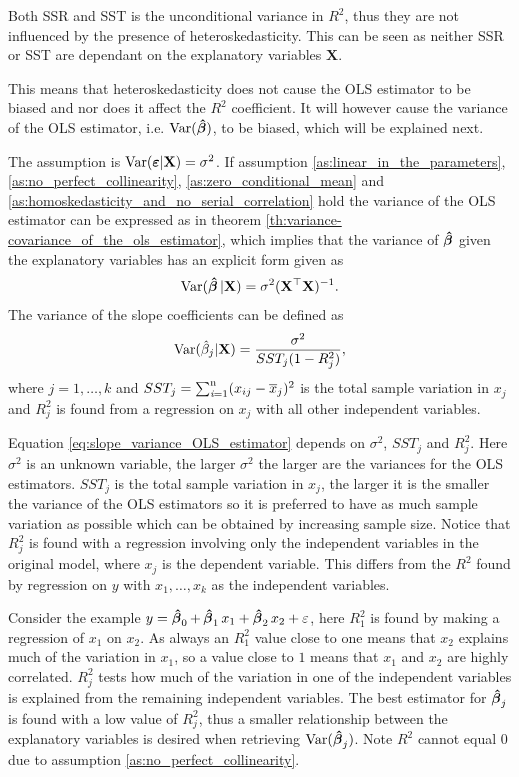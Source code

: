 Both SSR and SST is the unconditional variance in $R^2$, thus they are not influenced by the presence of heteroskedasticity. This can be seen as neither SSR or SST are dependant on the explanatory variables $\textbf{X}$.

This means that heteroskedasticity does not cause the OLS estimator to be biased and nor does it affect the $R^2$ coefficient. 
It will however cause the variance of the OLS estimator, i.e. $\operatorname{\text{Var}}(\operatorname{\boldsymbol{\hat{\beta}}})$, to be biased, which will be explained next.  

The \homo assumption is $\operatorname{\text{Var}}(\boldsymbol{\varepsilon} | \mathbf{X}) = \sigma^2$. If assumption \ref{as:linear_in_the_parameters}, \ref{as:no_perfect_collinearity}, \ref{as:zero_conditional_mean} and \ref{as:homoskedasticity_and_no_serial_correlation} hold the variance of the OLS estimator can be expressed as in theorem \ref{th:variance-covariance_of_the_ols_estimator}, which implies that the variance of $\operatorname{\boldsymbol{\hat{\beta}}}$ given the explanatory variables has an explicit form given as
\begin{align*}
    \operatorname{\text{Var}}(\operatorname{\boldsymbol{\hat{\beta}}} | \mathbf{X}) = \sigma^2(\mathbf{X}^\top\mathbf{X})^{-1}.
\end{align*}
The variance of the slope coefficients can be defined as
\begin{align}\label{eq:slope_variance_OLS_estimator}
    \operatorname{\text{Var}}(\hat{\beta}_j|\mathbf{X}) = \dfrac{\sigma^2}{SST_j(1- R_j^2)},
\end{align}
where $j = 1, \ldots, k$ and $SST_j = \operatorname{\sum_{\textit{i}=1}^n} (x_{ij} - \overline{x}_j)^2$ is the total sample variation in $x_j$ and $R^2_j$ is found from a regression on $x_j$ with all other independent variables. 

Equation \eqref{eq:slope_variance_OLS_estimator} depends on $\sigma^2$, $SST_j$ and $R^2_j$.
Here $\sigma^2$ is an unknown variable, the larger $\sigma^2$ the larger are the variances for the OLS estimators. $SST_j$ is the total sample variation in $x_j$, the larger it is the smaller the variance of the OLS estimators so it is preferred to have as much sample variation as possible which can be obtained by increasing sample size. 
Notice that $R^2_j$ is found with a regression involving only the independent variables in the original model, where $x_j$ is the dependent variable. 
This differs from the $R^2$ found by regression on $y$ with $x_1, \ldots, x_k$ as the independent variables. 

Consider the example $y = \operatorname{\boldsymbol{\hat{\beta}}}_0 + \operatorname{\boldsymbol{\hat{\beta}}}_1 x_1 + \operatorname{\boldsymbol{\hat{\beta}}}_2 x_2 + \varepsilon$, here $R^2_1$ is found by making a regression of $x_1$ on $x_2$. 
As always an $R^2_1$ value close to one means that $x_2$ explains much of the variation in $x_1$, so a value close to $1$ means that $x_1$ and $x_2$ are highly correlated.
$R^2_j$ tests how much of the variation in one of the independent variables is explained from the remaining independent variables.
The best estimator for $\operatorname{\boldsymbol{\hat{\beta}}}_j$ is found with a low value of $R^2_j$, thus a smaller relationship between the explanatory variables is desired when retrieving $\operatorname{\text{Var}}(\operatorname{\boldsymbol{\hat{\beta}}}_j)$. Note $R^2$ cannot equal $0$ due to assumption \ref{as:no_perfect_collinearity}. 

